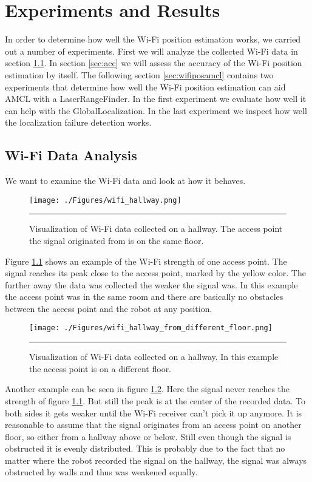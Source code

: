 \chapter{Experiments and Results} %
\label{Chapter4}
In order to determine how well the Wi-Fi position estimation works, we carried out a number of experiments. First we will analyze the collected Wi-Fi data in section \ref{sec:wifidata}. 
In section \ref{sec:acc} we will assess the accuracy of the Wi-Fi position estimation by itself.
The following section \ref{sec:wifiposamcl} contains two experiments that determine how well the Wi-Fi position estimation can aid AMCL with a \gls{LaserRangeFinder}. In the first experiment we evaluate how well it can help with the \gls{GlobalLocalization}. In the last experiment we inspect how well the localization failure detection works. 

\section{Wi-Fi Data Analysis}\label{sec:wifidata}
We want to examine the Wi-Fi data and look at how it behaves. 
\begin{figure}[htbp]
	\centering
		\texttt{[image: ./Figures/wifi\_hallway.png]}
		\rule{35em}{0.5pt}
	\caption[Hallway Wi-Fi data]{Visualization of Wi-Fi data collected on a hallway. The access point the signal originated from is on the same floor.}
	\label{fig:hallway_same_floor_wifi}
\end{figure}
Figure \ref{fig:hallway_same_floor_wifi} shows an example of the Wi-Fi strength of one access point. The signal reaches its peak close to the access point, marked by the yellow color. The further away the data was collected the weaker the signal was. In this example the access point was in the same room and there are basically no obstacles between the access point and the robot at any position. 
\begin{figure}[htbp]
	\centering
		\texttt{[image: ./Figures/wifi\_hallway\_from\_different\_floor.png]}
		\rule{35em}{0.5pt}
	\caption[Hallway Wi-Fi data]{Visualization of Wi-Fi data collected on a hallway. In this example the access point is on a different floor.}
	\label{fig:hallway_different_floor_wifi}
\end{figure}
Another example can be seen in figure \ref{fig:hallway_different_floor_wifi}. Here the signal never reaches the strength of figure \ref{fig:hallway_same_floor_wifi}. But still the peak is at the center of the recorded data. To both sides it gets weaker until the Wi-Fi receiver can't pick it up anymore. It is reasonable to assume that the signal originates from an access point on another floor, so either from a hallway above or below. Still even though the signal is obstructed it is evenly distributed. This is probably due to the fact that no matter where the robot recorded the signal on the hallway, the signal was always obstructed by walls and thus was weakened equally. 

